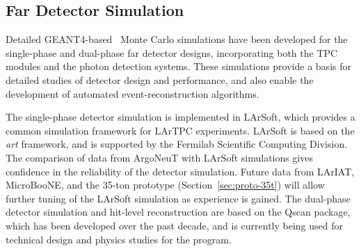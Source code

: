 \subsection{Far Detector Simulation}
\label{sec:detectors-sc-physics-software-simulation-fd}

Detailed GEANT4-based~\cite{GEANT4:NIM,GEANT4} Monte Carlo simulations
have been developed for the single-phase and dual-phase far detector
designs, incorporating both the TPC modules and the photon detection
systems. These simulations provide a basis for detailed studies of
detector design and performance, and also enable the development of
automated event-reconstruction algorithms.

The single-phase detector simulation is implemented in
LArSoft\cite{Church:2013hea}, which provides a common simulation
framework for LArTPC experiments.  LArSoft is based on the \textit{art}
framework\cite{Green:2012gv}, and is supported by the Fermilab
Scientific Computing Division.  The comparison of data from
ArgoNeuT\cite{Anderson:2012vc,Anderson:2012mra} with LArSoft
simulations gives confidence in the reliability of the detector
simulation.  Future data from
LArIAT\cite{Adamson:2013/02/28tla,Cavanna:2014iqa},
MicroBooNE\cite{Chen:2007ae,Jones:2011ci,microboonecdr}, and the
35-ton prototype (Section~\ref{sec:proto-35t}) will allow further tuning
of the LArSoft simulation as experience is gained.  The dual-phase
detector simulation and hit-level reconstruction are based on the
Qscan\cite{lussi:thesis} package, which has been developed over the
past decade, and is currently being used for technical design and
physics studies for the \cerndualproto{} program.

